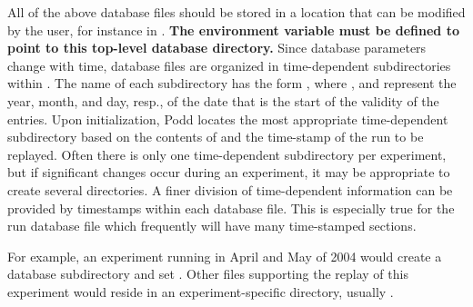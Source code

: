{{All of the above database files should be stored in a location
that can be modified by the user, for instance in .
{\bf The environment variable 
must be defined to point to this top-level database
directory.} Since database parameters change with time, database files
are organized in time-dependent subdirectories within .
The name of each subdirectory has the form , where
,  and 
represent the year, month, and day, resp., of the
date that is the start of the validity of the entries. Upon initialization,
Podd locates the most appropriate time-dependent subdirectory based on
the contents of 
and the time-stamp of the run to be replayed.
Often there is only one time-dependent subdirectory per experiment, but
if significant changes occur during an experiment, it may be appropriate to
create several directories.
A finer division of time-dependent information
can be provided by timestamps within each database file. This
is especially true for the run database file which frequently
will have many time-stamped sections.

For example, an experiment running in April and May of 2004 would
create a database subdirectory  and set
. Other files supporting the replay
of this experiment would reside in an experiment-specific
directory, usually .


} %

}
